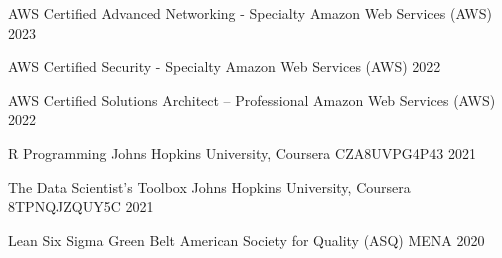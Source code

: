 

\begin{cvhonors}

  \cvhonor
    {AWS Certified Advanced Networking - Specialty} %
    {Amazon Web Services (AWS)} %
    {} %
    {2023} %

  \cvhonor
    {AWS Certified Security - Specialty} %
    {Amazon Web Services (AWS)} %
    {} %
    {2022} %

  \cvhonor
    {AWS Certified Solutions Architect – Professional} %
    {Amazon Web Services (AWS)} %
    {} %
    {2022} %

  \cvhonor
    {R Programming} %
    {Johns Hopkins University, Coursera} %
    {CZA8UVPG4P43} %
    {2021} %

  \cvhonor
    {The Data Scientist’s Toolbox} %
    {Johns Hopkins University, Coursera} %
    {8TPNQJZQUY5C} %
    {2021} %

  \cvhonor
    {Lean Six Sigma Green Belt} %
    {American Society for Quality (ASQ) MENA} %
    {}
    {2020} %

\end{cvhonors}

